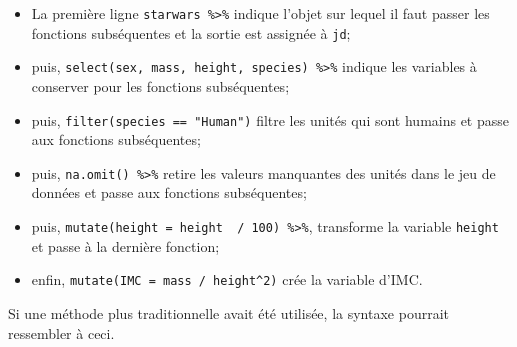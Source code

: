 \documentclass[
]{book}
\begin{document}
\begin{itemize}
\item
  La première ligne \texttt{starwars\ \%\textgreater{}\%} indique l'objet sur lequel il faut passer les fonctions subséquentes et la sortie est assignée à \texttt{jd};
\item
  puis, \texttt{select(sex,\ mass,\ height,\ species)\ \%\textgreater{}\%} indique les variables à conserver pour les fonctions subséquentes;
\item
  puis, \texttt{filter(species\ ==\ "Human")} filtre les unités qui sont humains et passe aux fonctions subséquentes;
\item
  puis, \texttt{na.omit()\ \%\textgreater{}\%} retire les valeurs manquantes des unités dans le jeu de données et passe aux fonctions subséquentes;
\item
  puis, \texttt{mutate(height\ =\ height\ \ /\ 100)\ \%\textgreater{}\%}, transforme la variable \texttt{height} et passe à la dernière fonction;
\item
  enfin, \texttt{mutate(IMC\ =\ mass\ /\ height\^{}2)} crée la variable d'IMC.
\end{itemize}

Si une méthode plus traditionnelle avait été utilisée, la syntaxe pourrait ressembler à ceci.
\end{document}
